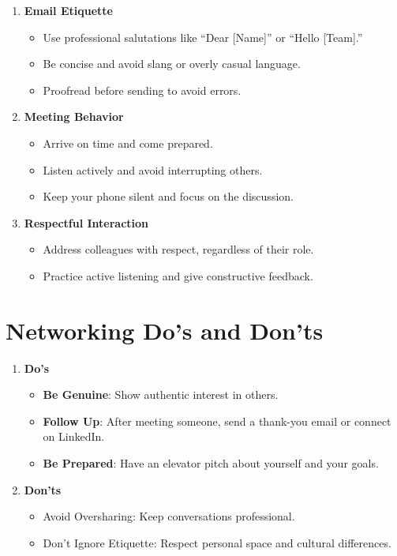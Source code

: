 \documentclass[
  letterpaper,
  DIV=11,
  numbers=noendperiod]{scrreprt}
\providecommand{\tightlist}{%
  \setlength{\itemsep}{0pt}\setlength{\parskip}{0pt}}\usepackage{longtable,booktabs,array}
\begin{document}
\begin{enumerate}
\def\labelenumi{\arabic{enumi}.}
\item
  \textbf{Email Etiquette}

  \begin{itemize}
  \tightlist
  \item
    Use professional salutations like ``Dear {[}Name{]}'' or ``Hello
    {[}Team{]}.''
  \item
    Be concise and avoid slang or overly casual language.
  \item
    Proofread before sending to avoid errors.
  \end{itemize}
\item
  \textbf{Meeting Behavior}

  \begin{itemize}
  \tightlist
  \item
    Arrive on time and come prepared.
  \item
    Listen actively and avoid interrupting others.
  \item
    Keep your phone silent and focus on the discussion.
  \end{itemize}
\item
  \textbf{Respectful Interaction}

  \begin{itemize}
  \tightlist
  \item
    Address colleagues with respect, regardless of their role.
  \item
    Practice active listening and give constructive feedback.
  \end{itemize}
\end{enumerate}

\section{Networking Do's and Don'ts}\label{networking-dos-and-donts}

\begin{enumerate}
\def\labelenumi{\arabic{enumi}.}
\item
  \textbf{Do's}

  \begin{itemize}
  \tightlist
  \item
    \textbf{Be Genuine}: Show authentic interest in others.
  \item
    \textbf{Follow Up}: After meeting someone, send a thank-you email or
    connect on LinkedIn.
  \item
    \textbf{Be Prepared}: Have an elevator pitch about yourself and your
    goals.
  \end{itemize}
\item
  \textbf{Don'ts}

  \begin{itemize}
  \tightlist
  \item
    Avoid Oversharing: Keep conversations professional.
  \item
    Don't Ignore Etiquette: Respect personal space and cultural
    differences.
  \end{itemize}
\end{enumerate}
\end{document}
